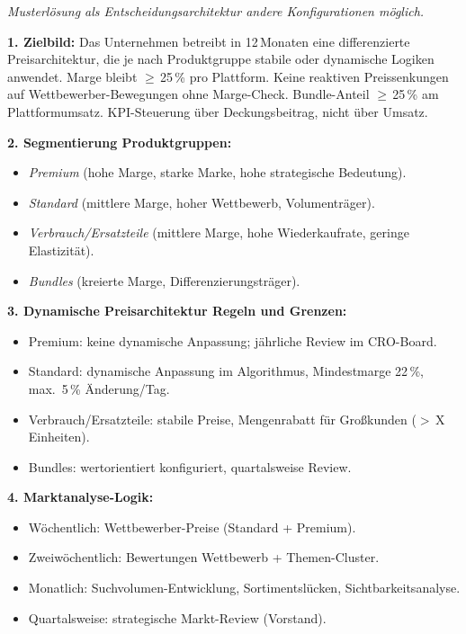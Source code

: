 \documentclass[11pt,a4paper,oneside]{article}
\begin{document}
\begin{loesungbox}
\emph{Musterlösung als Entscheidungsarchitektur \textendash{} andere Konfigurationen möglich.}

\smallskip
\textbf{1. Zielbild:}
Das Unternehmen betreibt in 12\,Monaten eine differenzierte Preisarchitektur, die je nach Produktgruppe stabile oder dynamische Logiken anwendet. Marge bleibt $\geq$\,25\,\% pro Plattform. Keine reaktiven Preissenkungen auf Wettbewerber-Bewegungen ohne Marge-Check. Bundle-Anteil $\geq$\,25\,\% am Plattformumsatz. KPI-Steuerung über Deckungsbeitrag, nicht über Umsatz.

\textbf{2. Segmentierung Produktgruppen:}
\begin{itemize}
  \item \emph{Premium} (hohe Marge, starke Marke, hohe strategische Bedeutung).
  \item \emph{Standard} (mittlere Marge, hoher Wettbewerb, Volumenträger).
  \item \emph{Verbrauch/Ersatzteile} (mittlere Marge, hohe Wiederkaufrate, geringe Elastizität).
  \item \emph{Bundles} (kreierte Marge, Differenzierungsträger).
\end{itemize}

\textbf{3. Dynamische Preisarchitektur \textendash{} Regeln und Grenzen:}
\begin{itemize}
  \item Premium: keine dynamische Anpassung; jährliche Review im CRO-Board.
  \item Standard: dynamische Anpassung im Algorithmus, Mindestmarge 22\,\%, max.\ 5\,\% Änderung/Tag.
  \item Verbrauch/Ersatzteile: stabile Preise, Mengenrabatt für Großkunden ($>$\,X Einheiten).
  \item Bundles: wertorientiert konfiguriert, quartalsweise Review.
\end{itemize}

\textbf{4. Marktanalyse-Logik:}
\begin{itemize}
  \item Wöchentlich: Wettbewerber-Preise (Standard + Premium).
  \item Zweiwöchentlich: Bewertungen Wettbewerb + Themen-Cluster.
  \item Monatlich: Suchvolumen-Entwicklung, Sortimentslücken, Sichtbarkeitsanalyse.
  \item Quartalsweise: strategische Markt-Review (Vorstand).
\end{itemize}


\end{loesungbox}
\end{document}
